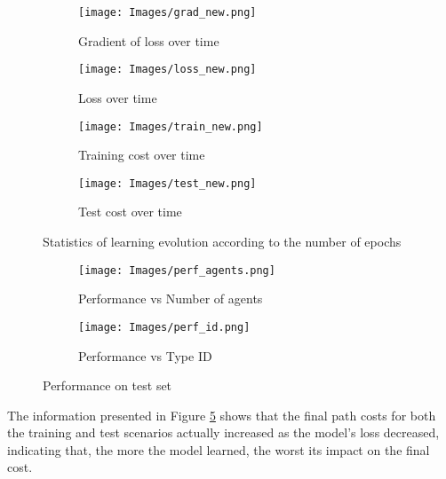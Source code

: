 \begin{figure}[!ht]
    \centering
    \begin{subfigure}[b]{0.3\textwidth}
        \texttt{[image: Images/grad\_new.png]}
        \caption{Gradient of loss over time}
        \label{fig:grad_loss}
    \end{subfigure}
    \hspace{0.01\textwidth}
    \begin{subfigure}[b]{0.3\textwidth}
        \texttt{[image: Images/loss\_new.png]}
        \caption{Loss over time}
        \label{fig:loss}
    \end{subfigure}

    \vspace{0.5cm}

    \begin{subfigure}[b]{0.3\textwidth}
        \texttt{[image: Images/train\_new.png]}
        \caption{Training cost over time}
        \label{fig:training_cost}
    \end{subfigure}
    \hspace{0.01\textwidth}
    \begin{subfigure}[b]{0.3\textwidth}
        \texttt{[image: Images/test\_new.png]}
        \caption{Test cost over time}
        \label{fig:test_cost}
    \end{subfigure}
    
    \caption{Statistics of learning evolution according to the number of epochs}
    \label{fig:loss_graph}
\end{figure}

\begin{figure}[!ht]
    \centering
    \begin{subfigure}[b]{0.45\textwidth}
        \texttt{[image: Images/perf\_agents.png]}
        \caption{Performance vs Number of agents}
        \label{fig:perf_agents}
    \end{subfigure}
    \hspace{0.01\textwidth}
    \begin{subfigure}[b]{0.45\textwidth}
        \texttt{[image: Images/perf\_id.png]}
        \caption{Performance vs Type ID}
        \label{fig:perf_id}
    \end{subfigure}
    
    \caption{Performance on test set}
    \label{fig:perf}
\end{figure}

The information presented in Figure \ref{fig:loss_graph} shows that the final path costs for both the training and test scenarios actually increased as the model's loss decreased, indicating that, the more the model learned, the worst its impact on the final cost.

